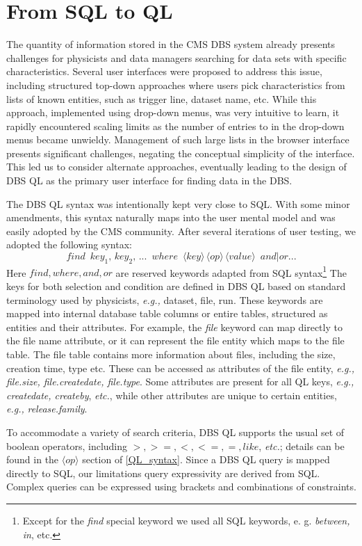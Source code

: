 \documentclass[a4paper]{jpconf}
\begin{document}
\section{From SQL to QL}

The quantity of information stored in the CMS DBS system already
presents challenges for physicists and data managers searching for
data sets with specific characteristics.
Several user interfaces were proposed to address this issue, including
structured top-down approaches where users pick characteristics
from lists of known entities, such as
trigger line, dataset name, etc.
While this approach, implemented using drop-down menus,
was very intuitive to learn,
it rapidly encountered scaling limits as the number of entries to in the drop-down menus
became unwieldy.
Management of such large lists in the browser interface presents significant challenges,
negating the conceptual simplicity of the interface. This led us to consider alternate
approaches, eventually leading to the design of
DBS QL as the primary user interface for finding data in the DBS.

The DBS QL syntax was intentionally kept very close to SQL.  With some minor amendments, this syntax naturally
maps into the user mental model and was easily adopted by the CMS
community. After several iterations of user testing, we adopted the following syntax:
\[
find\,\,\,
key_1,\, key_2,\, ...\,\,\, where\,\,\,
\langle key\rangle\, 
\langle op\rangle\, 
\langle value\rangle \,\,\, and|or ...
\label{QL_syntax}
\]
Here $find, where, and, or$ are reserved keywords
adapted from SQL syntax\footnote{Except for the {\it find} special
keyword we used all SQL keywords, e. g. {\it between, in}, etc.}
The keys for both selection and condition are defined
in DBS QL based on standard terminology used by physicists, {\it e.g.,} dataset, file, run. 
These keywords are mapped into internal database table columns or entire tables,
structured as entities and their attributes. For example,
the {\it file} keyword can map directly to the file name attribute, or it can represent the file
entity which maps to the file table. The file table
contains more information about files, including the size, creation time,
type etc. These can be accessed as attributes of the file entity, {\it e.g.,}
{\it file.size, file.createdate, file.type}. Some attributes
are present for all QL keys, {\it e.g.,} {\it createdate, createby}, {\it etc.},
while other attributes are unique to certain entities, {\it e.g.,} {\it release.family}.

To accommodate a variety of search criteria, DBS QL supports
the usual set of boolean operators, including $>, >=, <, <=, =, like$, {\it etc.};
details can be found in the $\langle op\rangle$ section of \ref{QL_syntax}.
Since a DBS QL query is mapped directly to SQL, our limitations query expressivity
are derived from SQL.  Complex queries can be expressed using
brackets and combinations of constraints.
\end{document}
